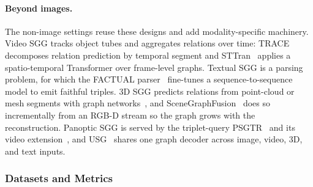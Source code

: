 \paragraph{Beyond images.}
The non-image settings reuse these designs and add modality-specific machinery. Video SGG tracks object tubes and aggregates relations over time: TRACE~\cite{teng2021target} decomposes relation prediction by temporal segment and STTran~\cite{cong2021spatial} applies a spatio-temporal Transformer over frame-level graphs. Textual SGG is a parsing problem, for which the FACTUAL parser~\cite{li2023factual} fine-tunes a sequence-to-sequence model to emit faithful triples. 3D SGG predicts relations from point-cloud or mesh segments with graph networks~\cite{wald2020learning}, and SceneGraphFusion~\cite{wu2021scenegraphfusion} does so incrementally from an RGB-D stream so the graph grows with the reconstruction. Panoptic SGG is served by the triplet-query PSGTR~\cite{yang2022panoptic} and its video extension~\cite{yang2023panoptic}, and USG~\cite{wu2025universal} shares one graph decoder across image, video, 3D, and text inputs.


\subsubsection{Datasets and Metrics}


